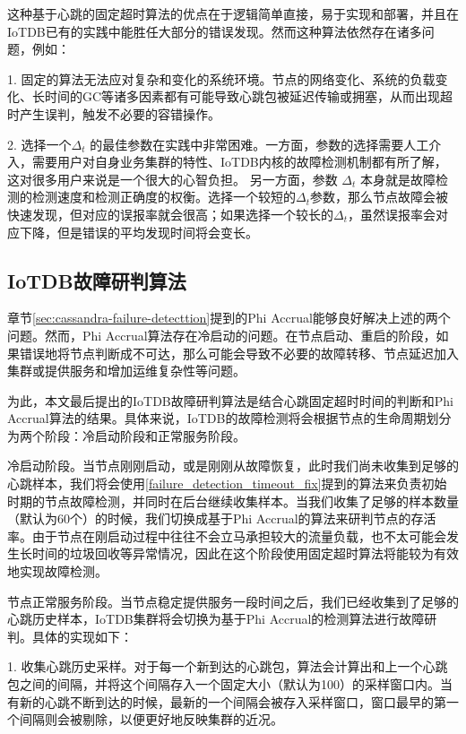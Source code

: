 这种基于心跳的固定超时算法的优点在于逻辑简单直接，易于实现和部署，并且在IoTDB已有的实践中能胜任大部分的错误发现。然而这种算法依然存在诸多问题，例如：

1. 固定的算法无法应对复杂和变化的系统环境。节点的网络变化、系统的负载变化、长时间的GC等诸多因素都有可能导致心跳包被延迟传输或拥塞，从而出现超时产生误判，触发不必要的容错操作。

2. 选择一个$\Delta_{t}$ 的最佳参数在实践中非常困难。一方面，参数的选择需要人工介入，需要用户对自身业务集群的特性、IoTDB内核的故障检测机制都有所了解，这对很多用户来说是一个很大的心智负担。
另一方面，参数 $\Delta_{t}$ 本身就是故障检测的检测速度和检测正确度的权衡。选择一个较短的$\Delta_{t}$参数，那么节点故障会被快速发现，但对应的误报率就会很高；如果选择一个较长的$\Delta_{t}$，虽然误报率会对应下降，但是错误的平均发现时间将会变长。

\subsection{IoTDB故障研判算法}

章节\ref{sec:cassandra-failure-detecttion}提到的Phi Accrual能够良好解决上述的两个问题。然而，Phi Accrual算法存在冷启动的问题。在节点启动、重启的阶段，如果错误地将节点判断成不可达，那么可能会导致不必要的故障转移、节点延迟加入集群或提供服务和增加运维复杂性等问题。

为此，本文最后提出的IoTDB故障研判算法是结合心跳固定超时时间的判断和Phi Accrual算法的结果。具体来说，IoTDB的故障检测将会根据节点的生命周期划分为两个阶段：冷启动阶段和正常服务阶段。

冷启动阶段。当节点刚刚启动，或是刚刚从故障恢复，此时我们尚未收集到足够的心跳样本，我们将会使用\ref{failure_detection_timeout_fix}提到的算法来负责初始时期的节点故障检测，并同时在后台继续收集样本。当我们收集了足够的样本数量（默认为60个）的时候，我们切换成基于Phi Accrual的算法来研判节点的存活率。由于节点在刚启动过程中往往不会立马承担较大的流量负载，也不太可能会发生长时间的垃圾回收等异常情况，因此在这个阶段使用固定超时算法将能较为有效地实现故障检测。

节点正常服务阶段。当节点稳定提供服务一段时间之后，我们已经收集到了足够的心跳历史样本，IoTDB集群将会切换为基于Phi Accrual的检测算法进行故障研判。具体的实现如下：

1. 收集心跳历史采样。对于每一个新到达的心跳包，算法会计算出和上一个心跳包之间的间隔，并将这个间隔存入一个固定大小（默认为100）的采样窗口内。当有新的心跳不断到达的时候，最新的一个间隔会被存入采样窗口，窗口最早的第一个间隔则会被剔除，以便更好地反映集群的近况。

